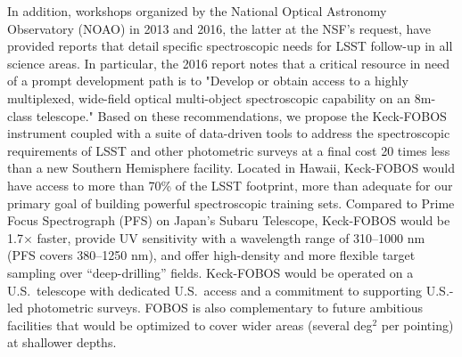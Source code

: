 \documentclass[oneside,11pt]{amsart}
\begin{document}


In addition, workshops organized by the National Optical Astronomy
Observatory (NOAO) in 2013 and 2016, the latter at the NSF's request,
have provided reports that detail specific spectroscopic needs for LSST
follow-up in all science areas.  In particular, the 2016 report notes
that a critical resource in need of a prompt development path is to
"Develop or obtain access to a highly multiplexed, wide-field optical
multi-object spectroscopic capability on an 8m-class telescope." Based
on these recommendations, we propose the Keck-FOBOS instrument coupled
with a suite of data-driven tools to address the spectroscopic
requirements of LSST and other photometric surveys at a final cost 20
times less than a new Southern Hemisphere facility. Located in Hawaii,
Keck-FOBOS would have access to more than 70\% of the LSST footprint,
more than adequate for our primary goal of building powerful
spectroscopic training sets.  Compared to Prime Focus Spectrograph (PFS)
on Japan's Subaru Telescope, Keck-FOBOS would be 1.7$\times$ faster,
provide UV sensitivity with a wavelength range of 310--1000 nm (PFS
covers 380--1250 nm), and offer high-density and more flexible target
sampling over ``deep-drilling'' fields.  Keck-FOBOS would be operated on
a U.S.\ telescope with dedicated U.S.\ access and a commitment to
supporting U.S.-led photometric surveys.  FOBOS is also complementary to
future ambitious facilities that would be optimized to cover wider areas
(several deg$^2$ per pointing) at shallower depths.
\end{document}
